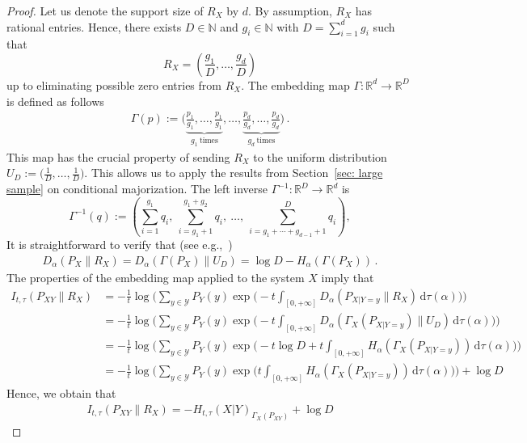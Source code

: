 \documentclass[aps,pra,11pt,onecolumn,nofootinbib,tightenlines]{revtex4-2}
\theoremstyle{definition}
\newcommand{\mc}[1]{\mathcal{#1}}
\begin{document}
\begin{proof}
Let us denote the support size of $R_X$ by $d$. By assumption, $R_X$ has rational entries. Hence, there exists $D \in \mathbb{N}$ and $g_i \in \mathbb{N}$ with $D= \sum_{i=1}^d g_i$ such that
\begin{equation}
R_X = \left( \frac{g_1}{D}, \ldots, \frac{g_d}{D} \right)
\end{equation}
up to eliminating possible zero entries from $R_X$. The embedding map $\Gamma : \mathbb{R}^d \to \mathbb{R}^D$ is defined as follows
\begin{align}
\Gamma(p) := \Big( \underbrace{\frac{p_1}{g_1}, \ldots, \frac{p_1}{g_1}}_{g_1 \ \text{times}}, \ldots, \underbrace{\frac{p_d}{g_d}, \ldots, \frac{p_d}{g_d}}_{g_d \ \text{times}} \Big)\,.
\end{align}
This map has the crucial property of sending $R_X$ to the uniform distribution $U_D := \big(\tfrac{1}{D}, \ldots, \tfrac{1}{D}\big)$. This allows us to apply the results from Section~\ref{sec: large sample} on conditional majorization. 
The left inverse $\Gamma^{-1} : \mathbb{R}^D \to \mathbb{R}^d$ is 
\begin{equation}
\label{PsInvEmbed}
\Gamma^{-1}(q) := \left( \sum_{i=1}^{g_1} q_i,\ \sum_{i=g_1+1}^{g_1 + g_2} q_i,\ \ldots,\ \sum_{i = g_1 + \cdots + g_{d-1} + 1}^{D} q_i \right),
\end{equation}
It is straightforward to verify that (see e.g.,~\cite[Lemma 13]{Brandao})
\begin{align}
    D_{\alpha}(P_X \| R_X) = D_{\alpha}(\Gamma(P_X) \| U_D) = \log{D} - H_\alpha (\Gamma(P_X))\,.
\end{align}
The properties of the embedding map applied to the system $X$ imply that
\begin{align}
    I_{t,\tau}(P_{XY} \| R_X) &=  -\frac{1}{t} \log \Bigg( \sum_{y \in \mc Y} P_Y(y) \exp \Big( -t\int_{[0,+\infty]}D_\alpha(P_{X|Y=y} \| R_{X}) \, \mathrm{d} \tau(\alpha) \Big) \Bigg) \\
    & =-\frac{1}{t} \log \Bigg( \sum_{y \in\mc Y} P_Y(y) \exp \Big( -t\int_{[0,+\infty]} D_\alpha(\Gamma_X(P_{X|Y=y}) \| U_D) \, \mathrm{d} \tau(\alpha) \Big) \Bigg) \\
    & = -\frac{1}{t} \log \Bigg( \sum_{y \in\mc Y} P_Y(y) \exp \Big( -t \log{D} +t\int_{[0,+\infty]} H_\alpha(\Gamma_X(P_{X|Y=y})) \, \mathrm{d} \tau(\alpha) \Big) \Bigg)\\
    & = -\frac{1}{t} \log \Bigg( \sum_{y \in\mc Y} P_Y(y) \exp \Big(t\int_{[0,+\infty]} H_\alpha(\Gamma_X(P_{X|Y=y})) \, \mathrm{d} \tau(\alpha) \Big) \Bigg) + \log{D}
\end{align}
Hence, we obtain that
\begin{align}
    I_{t,\tau}(P_{XY} \| R_X) = -H_{t,\tau}(X|Y)_{\Gamma_X(P_{XY})} + \log{D}
\end{align}


\end{proof}
\end{document}
